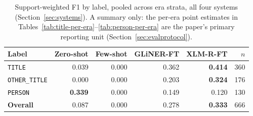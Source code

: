 \begin{table}
  \caption{Support-weighted F1 by label, pooled across era strata, all four systems (Section~\ref{sec:systems}). A summary only: the per-era point estimates in Tables~\ref{tab:title-per-era}--\ref{tab:person-per-era} are the paper's primary reporting unit (Section~\ref{sec:evalprotocol}).}
  \label{tab:summary}
  \setlength{\tabcolsep}{3pt}
  \begin{tabular}{lrrrrr}
    \toprule
    Label & Zero-shot & Few-shot & GLiNER-FT & XLM-R-FT & $n$ \\
    \midrule
    \texttt{TITLE} & 0.039 & 0.000 & 0.362 & \textbf{0.414} & 360 \\
    \texttt{OTHER\_TITLE} & 0.000 & 0.000 & 0.203 & \textbf{0.324} & 176 \\
    \texttt{PERSON} & \textbf{0.339} & 0.000 & 0.149 & 0.120 & 130 \\
    \textbf{Overall} & 0.087 & 0.000 & 0.278 & \textbf{0.333} & 666 \\
    \bottomrule
  \end{tabular}
\end{table}
